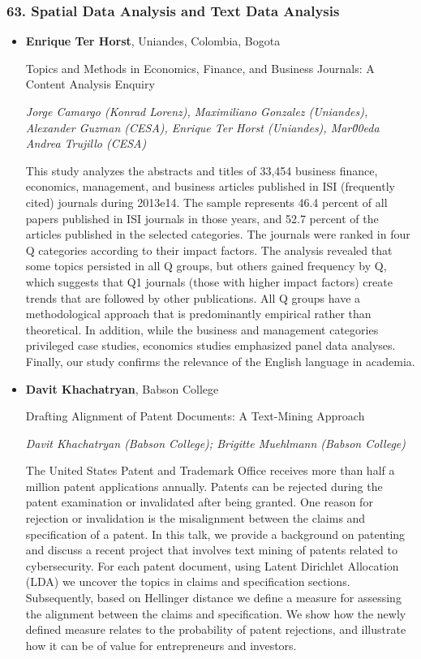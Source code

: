 \subsubsection*{63. Spatial Data Analysis and Text Data Analysis}

\begin{itemize}
\item \textbf{Enrique Ter Horst}, Uniandes, Colombia, Bogota

Topics and Methods in Economics, Finance, and Business Journals: A Content Analysis Enquiry

\emph{\footnotesize Jorge Camargo (Konrad Lorenz), Maximiliano Gonzalez (Uniandes), Alexander Guzman (CESA), Enrique Ter Horst (Uniandes), Mar\u00eda Andrea Trujillo (CESA)}

This study analyzes the abstracts and titles of 33,454 business finance, economics, management, and business articles published in ISI (frequently cited) journals during 2013e14. The sample represents 46.4 percent of all papers published in ISI journals in those years, and 52.7 percent of the articles published in the selected categories. The journals were ranked in four Q categories according to their impact factors. The analysis revealed that some topics persisted in all Q groups, but others gained frequency by Q, which suggests that Q1 journals (those with higher impact factors) create trends that are followed by other publications. All Q groups have a methodological approach that is predominantly empirical rather than theoretical. In addition, while the business and management categories privileged case studies, economics studies emphasized panel data analyses. Finally, our study confirms the relevance of the English language in academia.

\item \textbf{Davit Khachatryan}, Babson College

Drafting Alignment of Patent Documents: A Text-Mining Approach

\emph{\footnotesize Davit Khachatryan (Babson College); Brigitte Muehlmann (Babson College)}

The United States Patent and Trademark Office receives more than half a million patent applications annually. Patents can be rejected during the patent examination or invalidated after being granted. One reason for rejection or invalidation is the misalignment between the claims and specification of a patent. In this talk, we provide a background on patenting and discuss a recent project that involves text mining of patents related to cybersecurity. For each patent document, using Latent Dirichlet Allocation (LDA) we uncover the topics in claims and specification sections. Subsequently, based on Hellinger distance we define a measure for assessing the alignment between the claims and specification. We show how the newly defined measure relates to the probability of patent rejections, and illustrate how it can be of value for entrepreneurs and investors.


\end{itemize}
